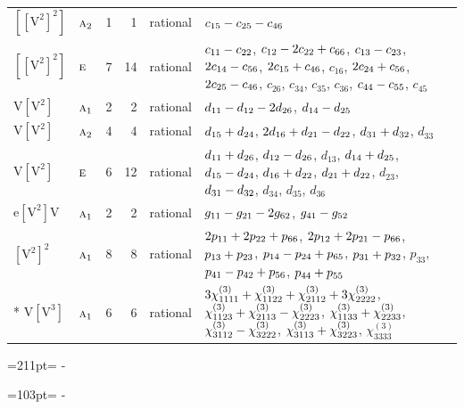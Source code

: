 \documentclass[10pt,a4paper]{article}
\newcommand{\needspace}[1]{\par\penalty-100\begingroup\dimen0=#1\relax\dimen2=\pagegoal
  \advance\dimen2-\pagetotal\ifdim\dimen0>\dimen2\relax\ifdim\dimen2>0pt\vfil\break\fi\fi
  \endgroup}
\numberwithin{equation}{section}
\newcommand{\irr}[1]{\text{\normalfont\scshape #1}}
\newcommand{\jahn}[1]{\mathrm{#1}}
\newlength{\fillwidth}\newlength{\cellwidth}\newlength{\colwidth}
\newcommand{\signbreak}{\penalty100\relax}
\begin{document}
{\begin{longtable}{@{}llrrl>{\RaggedRight\arraybackslash}p{\fillwidth}@{}}
$\jahn{[[V^{2}]^{2}]}$ & $\irr{a}_{2}$ & 1 & 1 & rational & $c_{15} -\signbreak c_{25} -\signbreak c_{46}$\\
$\jahn{[[V^{2}]^{2}]}$ & $\irr{e}$ & 7 & 14 & rational & $c_{11} -\signbreak c_{22}$, $c_{12} -\signbreak 2c_{22} +\signbreak c_{66}$, $c_{13} -\signbreak c_{23}$, $2c_{14} -\signbreak c_{56}$, $2c_{15} +\signbreak c_{46}$, $c_{16}$, $2c_{24} +\signbreak c_{56}$, $2c_{25} -\signbreak c_{46}$, $c_{26}$, $c_{34}$, $c_{35}$, $c_{36}$, $c_{44} -\signbreak c_{55}$, $c_{45}$\\
$\jahn{V[V^{2}]}$ & $\irr{a}_{1}$ & 2 & 2 & rational & $d_{11} -\signbreak d_{12} -\signbreak 2d_{26}$, $d_{14} -\signbreak d_{25}$\\
$\jahn{V[V^{2}]}$ & $\irr{a}_{2}$ & 4 & 4 & rational & $d_{15} +\signbreak d_{24}$, $2d_{16} +\signbreak d_{21} -\signbreak d_{22}$, $d_{31} +\signbreak d_{32}$, $d_{33}$\\
$\jahn{V[V^{2}]}$ & $\irr{e}$ & 6 & 12 & rational & $d_{11} +\signbreak d_{26}$, $d_{12} -\signbreak d_{26}$, $d_{13}$, $d_{14} +\signbreak d_{25}$, $d_{15} -\signbreak d_{24}$, $d_{16} +\signbreak d_{22}$, $d_{21} +\signbreak d_{22}$, $d_{23}$, $d_{31} -\signbreak d_{32}$, $d_{34}$, $d_{35}$, $d_{36}$\\
$\jahn{e[V^{2}]V}$ & $\irr{a}_{1}$ & 2 & 2 & rational & $\mathnormal{g}_{11} -\signbreak \mathnormal{g}_{21} -\signbreak 2\mathnormal{g}_{62}$, $\mathnormal{g}_{41} -\signbreak \mathnormal{g}_{52}$\\
$\jahn{[V^{2}]^{2}}$ & $\irr{a}_{1}$ & 8 & 8 & rational & $2p_{11} +\signbreak 2p_{22} +\signbreak p_{66}$, $2p_{12} +\signbreak 2p_{21} -\signbreak p_{66}$, $p_{13} +\signbreak p_{23}$, $p_{14} -\signbreak p_{24} +\signbreak p_{65}$, $p_{31} +\signbreak p_{32}$, $p_{33}$, $p_{41} -\signbreak p_{42} +\signbreak p_{56}$, $p_{44} +\signbreak p_{55}$\\*
$\jahn{V[V^{3}]}$ & $\irr{a}_{1}$ & 6 & 6 & rational & $3\chi^{(3)}_{1111} +\signbreak \chi^{(3)}_{1122} +\signbreak \chi^{(3)}_{2112} +\signbreak 3\chi^{(3)}_{2222}$, $\chi^{(3)}_{1123} +\signbreak \chi^{(3)}_{2113} -\signbreak \chi^{(3)}_{2223}$, $\chi^{(3)}_{1133} +\signbreak \chi^{(3)}_{2233}$, $\chi^{(3)}_{3112} -\signbreak \chi^{(3)}_{3222}$, $\chi^{(3)}_{3113} +\signbreak \chi^{(3)}_{3223}$, $\chi^{(3)}_{3333}$\\
\bottomrule\end{longtable}}
\needspace{211pt}
\needspace{103pt}
\end{document}
